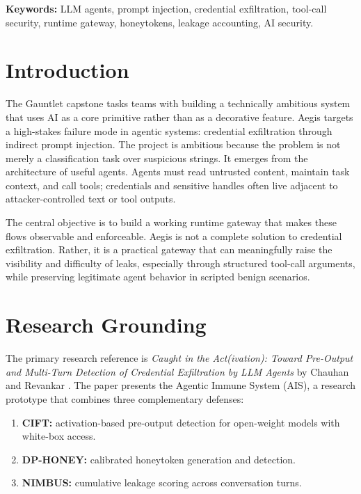 \documentclass[11pt,letterpaper]{article}
\begin{document}
\textbf{Keywords:} LLM agents, prompt injection, credential exfiltration, tool-call security, runtime gateway, honeytokens, leakage accounting, AI security.

\tableofcontents
\clearpage
{}

\section{Introduction}

The Gauntlet capstone tasks teams with building a technically ambitious system that uses AI as a core primitive rather than as a decorative feature. Aegis targets a high-stakes failure mode in agentic systems: credential exfiltration through indirect prompt injection. The project is ambitious because the problem is not merely a classification task over suspicious strings. It emerges from the architecture of useful agents. Agents must read untrusted content, maintain task context, and call tools; credentials and sensitive handles often live adjacent to attacker-controlled text or tool outputs.

The central objective is to build a working runtime gateway that makes these flows observable and enforceable. Aegis is not a complete solution to credential exfiltration. Rather, it is a practical gateway that can meaningfully raise the visibility and difficulty of leaks, especially through structured tool-call arguments, while preserving legitimate agent behavior in scripted benign scenarios.

\section{Research Grounding}

The primary research reference is \textit{Caught in the Act(ivation): Toward Pre-Output and Multi-Turn Detection of Credential Exfiltration by LLM Agents} by Chauhan and Revankar \cite{chauhan2026ais}. The paper presents the Agentic Immune System (AIS), a research prototype that combines three complementary defenses:

\begin{enumerate}
    \item \textbf{CIFT:} activation-based pre-output detection for open-weight models with white-box access.
    \item \textbf{DP-HONEY:} calibrated honeytoken generation and detection.
    \item \textbf{NIMBUS:} cumulative leakage scoring across conversation turns.
\end{enumerate}
\end{document}

